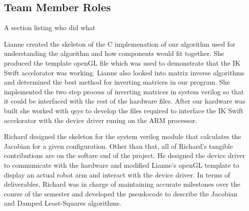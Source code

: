 \subsection{Team Member Roles}
A section listing who did what

Lianne created the skeleton of the C implemenation of our algorithm used 
for understanding the algorithm and how components would fit together. She 
produced the template openGL file which was used to demonstrate that the 
IK Swift accelorator was working. Lianne also looked into matrix inverse 
algorithms and determined the best method for inverting matrices in our 
program. She implemented the two step process of inverting matrices in 
system verilog so that it could be interfaced with the rest of the 
hardware files. After our hardware was built she worked with qsys to 
develop the files required to interface the IK Swift accelorator with 
the device driver runing on the ARM processor. 

Richard designed the skeleton for the system verilog module that calculates the Jacobian
for a given configuration. Other than that, all of Richard's tangible contributions are on the
softare end of the project. He designed the device driver to communicate with the hardware and
modified Lianne's openGL template to display an actual robot arm and interact with the device
driver. In terms of deliverables, Richard was in charge of maintaining accurate milestones over the
course of the semester and developed the pseudocode to describe the Jacobian and
Damped Least-Squares algorithms.
